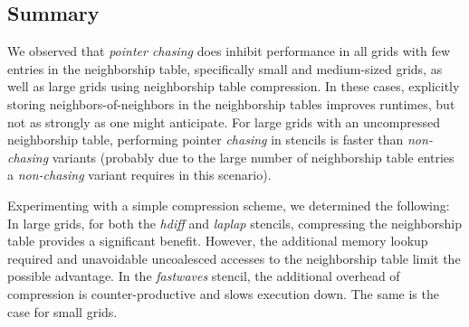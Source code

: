 
\subsection{Summary}

We observed that \emph{pointer chasing} does inhibit performance in all grids with few entries in the neighborship table, specifically small and medium-sized grids, as well as large grids using neighborship table compression. In these cases, explicitly storing neighbors-of-neighbors in the neighborship tables improves runtimes, but not as strongly as one might anticipate. For large grids with an uncompressed neighborship table, performing pointer \emph{chasing} in stencils is faster than \emph{non-chasing} variants (probably due to the large number of neighborship table entries a \emph{non-chasing} variant requires in this scenario).

Experimenting with a simple compression scheme, we determined the following: In large grids, for both the \emph{hdiff} and \emph{laplap} stencils, compressing the neighborship table provides a significant benefit. However, the additional memory lookup required and unavoidable uncoalesced accesses to the neighborship table limit the possible advantage. In the \emph{fastwaves} stencil, the additional overhead of compression is counter-productive and slows execution down. The same is the case for small grids.